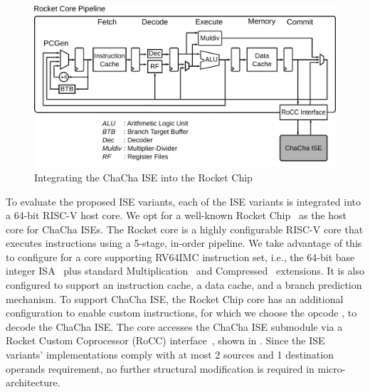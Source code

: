 \begin{figure}
	\centering
	\includegraphics[scale=0.77]{figures/RocketCoreRoCC.png}
	\caption{Integrating the ChaCha ISE into the Rocket Chip}
	\label{fig:ise:RocketCoreRoCC} 
\end{figure} 

To evaluate the proposed ISE variants, each of the ISE variants is integrated into a 64-bit RISC-V host core. 
We opt for a well-known Rocket Chip~\cite{rocket:16} as the host core for ChaCha ISEs. 
The Rocket core is a highly configurable RISC-V core that executes instructions using a 5-stage, in-order pipeline. 
We take advantage of this to configure for a core supporting RV64IMC instruction set, i.e., the 64-bit base integer ISA~\cite[Chapter 5]{RV:ISA:I} plus standard Multiplication~\cite[Chapter 7]{RV:ISA:I} and Compressed~\cite[Chapter 16]{RV:ISA:I} extensions. It is also configured to support an instruction cache, a data cache, and a branch prediction mechanism.
To support ChaCha ISE, the Rocket Chip core has an additional configuration to enable custom instructions, for which we choose the  opcode \cite[Chapter 25]{RV:ISA:I}, to decode the ChaCha ISE.
The core accesses the ChaCha ISE submodule via a Rocket Custom Coprocessor (RoCC) interface~\cite[Section 4]{rocket:16}, shown in . Since the ISE variants' implementations 
comply with at most 2 sources and 1 destination operands requirement, no further structural modification is required in micro-architecture. 

